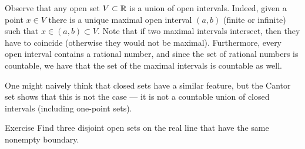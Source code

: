 Observe that any open set $V\subset\mathbb{R}$ is a union of open intervals.
Indeed, given a point $x\in V$ there is a unique maximal open interval $(a,b)$ (finite or infinite) such that
$x\in (a,b)\subset V$.
Note that if two maximal intervals intersect, then they have to coincide (otherwise they would not be maximal).
Furthermore, every open interval contains a rational number, and since the set of rational numbers is countable, we have that the set of the maximal intervals is countable as well.

One might naively think that closed sets have a similar feature, but
the Cantor set shows that this is not the case --- it is not a countable union of closed intervals (including one-point sets).

\begin{thm}{Exercise}\label{ex:3=bry}
Find three disjoint open sets on the real line
that have the same nonempty boundary.
\end{thm}


